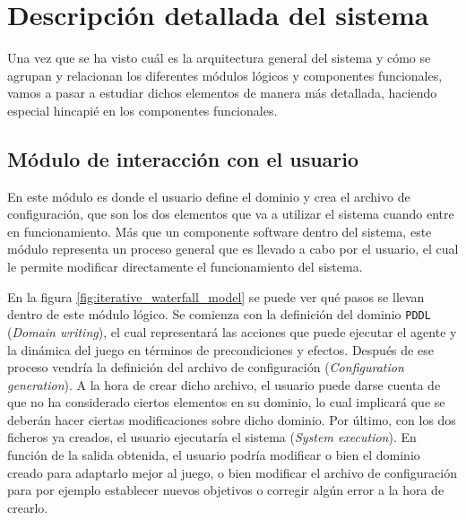
\chapter{Descripción detallada del sistema}
\label{chap:desc}

Una vez que se ha visto cuál es la arquitectura general del sistema y cómo se agrupan
y relacionan los diferentes módulos lógicos y componentes funcionales, vamos a pasar
a estudiar dichos elementos de manera más detallada, haciendo especial hincapié en los
componentes funcionales.

\section{Módulo de interacción con el usuario}

En este módulo es donde el usuario define el dominio y crea el archivo
de configuración, que son los dos elementos que va a utilizar el sistema cuando entre en
funcionamiento. Más que un componente software dentro del sistema, este módulo representa un
proceso general que es llevado a cabo por el usuario, el cual le permite modificar directamente
el funcionamiento del sistema.

En la figura \ref{fig:iterative_waterfall_model} se puede ver qué pasos se llevan dentro de este
módulo lógico. Se comienza con la definición del dominio \texttt{PDDL} (\textit{Domain writing}), el cual
representará las acciones que puede ejecutar el agente y la dinámica del juego en términos de precondiciones
y efectos. Después de ese proceso vendría la definición del archivo de configuración
(\textit{Configuration generation}). A la hora de crear dicho archivo, el usuario puede darse cuenta de que no ha
considerado ciertos elementos en su dominio, lo cual implicará que se deberán hacer ciertas modificaciones
sobre dicho dominio. Por último, con los dos ficheros ya creados, el usuario ejecutaría el sistema
(\textit{System execution}). En función de la salida obtenida, el usuario podría modificar o bien el
dominio creado para adaptarlo mejor al juego, o bien modificar el archivo de configuración para por ejemplo
establecer nuevos objetivos o corregir algún error a la hora de crearlo.

